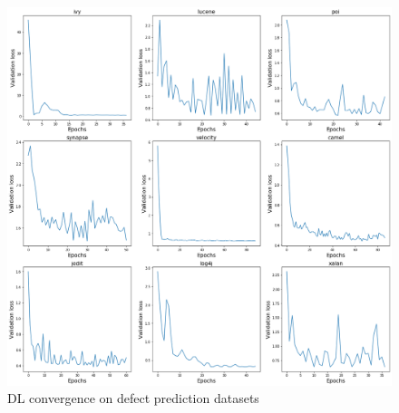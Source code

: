 \documentclass[10pt,compsoc,twocolumn]{IEEEtran}
\begin{document}
\begin{figure}[!t]
    \centering
    \includegraphics[width=.49\textwidth]{convergence.png}
    \caption{DL convergence on defect prediction datasets}
    \label{fig:convergence}
\end{figure}


\end{document}
